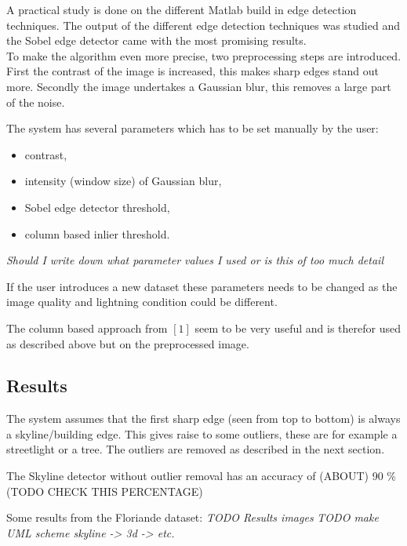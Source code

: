 \documentclass[10pt]{article}
\begin{document}
A practical study is done on the different Matlab build in edge detection
techniques. The output of the different edge detection techniques was studied
and the Sobel edge detector came with the most promising results.\\ 

To make the algorithm even more precise, two preprocessing
steps are introduced. First the contrast of the image is increased, this makes
sharp edges stand out more.  Secondly the image undertakes a Gaussian blur,
this removes a large part of the noise.

The system has several parameters which has to be set manually by the user:
\begin{itemize}
\item contrast,
\item intensity (window size) of Gaussian blur,
\item Sobel edge detector threshold,
\item column based inlier threshold.
\end{itemize}
\textit{Should I write down what parameter values I used or is this of too much
detail}

If the user introduces a new dataset these parameters needs to be changed
as the image quality and lightning condition could be different.

The column based approach from $[1]$ seem to be very useful and is therefor
used as described above but on the preprocessed image.




 \subsection{Results}%
The system assumes that the first sharp edge (seen from top to bottom) is
always a skyline/building edge. This gives raise to some outliers, these are
for example a streetlight or a tree. The outliers are removed as described in
the next section.  


The Skyline detector without outlier removal has an
accuracy of (ABOUT) 90 \% (TODO CHECK THIS PERCENTAGE) 

Some results from the Floriande dataset:
\textit{ TODO Results images}
\textit{ TODO make UML scheme skyline -> 3d -> etc.}
\\
\end{document}
